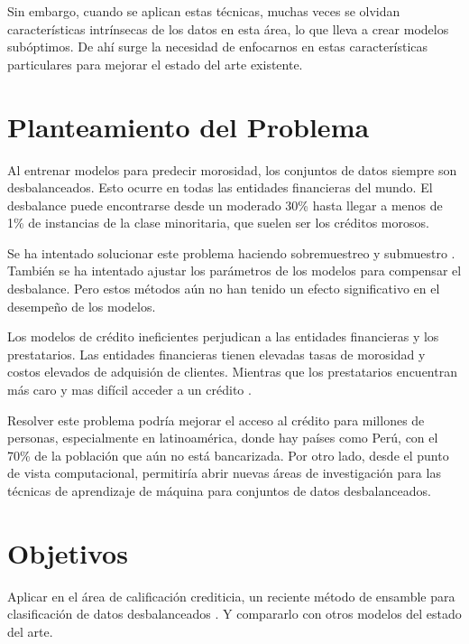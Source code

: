 Sin embargo, cuando se aplican estas técnicas, muchas veces se olvidan características intrínsecas de los datos en esta área, lo que lleva a crear modelos subóptimos. De ahí surge la necesidad de enfocarnos en estas características particulares para mejorar el estado del arte existente.

\section{Planteamiento del Problema}

Al entrenar modelos para predecir morosidad, los conjuntos de datos siempre son desbalanceados. Esto ocurre en todas las entidades financieras del mundo. El desbalance puede encontrarse desde un moderado 30\% hasta llegar a menos de 1\% de instancias de la clase minoritaria, que suelen ser los créditos morosos.

Se ha intentado solucionar este problema haciendo sobremuestreo y submuestro \citep{drummond2003c4}. También se ha intentado ajustar los parámetros de los modelos para compensar el desbalance. Pero estos métodos aún no han tenido un efecto significativo en el desempeño de los modelos.

Los modelos de crédito ineficientes perjudican a las entidades financieras y los prestatarios. Las entidades financieras tienen elevadas tasas de morosidad y costos elevados de adquisión de clientes. Mientras que los prestatarios encuentran más caro y mas difícil acceder a un crédito \citep{avery2009credit}.

Resolver este problema podría mejorar el acceso al crédito para millones de personas, especialmente en latinoamérica, donde hay países como Perú, con el 70\% de la población que aún no está bancarizada. Por otro lado, desde el punto de vista computacional, permitiría abrir nuevas áreas de investigación para las técnicas de aprendizaje de máquina para conjuntos de datos desbalanceados.


\section{Objetivos}

Aplicar en el área de calificación crediticia, un reciente método de ensamble para clasificación de datos desbalanceados \citep{sun2015novel}. Y compararlo con otros modelos del estado del arte.


